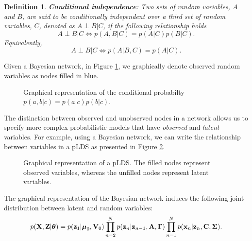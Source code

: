 \documentclass[12pt, oneside]{book}
\numberwithin{equation}{section}
\newcommand{\x}{{\bf x}}
\newcommand{\z}{{\bf z}}
\newtheorem{definition}{Definition}[section]
\begin{document}
{%
\begin{definition}
	\textbf{Conditional independence}: Two sets of random variables, $A$ and $B$, are said to be conditionally independent over a third set of random variables, $C$, denoted as $A \perp B \vert C$, if the following relationship holds
	\begin{equation}
		A \perp B \vert C \iff p(A, B \vert C) = p(A \vert C) p(B \vert C).
	\end{equation}
	Equivalently,
	\begin{equation}
		A \perp B \vert C \iff p(A \vert B, C) = p(A \vert C).
	\end{equation}
\end{definition}

Given a Bayesian network, in Figure \ref{fig:bayes-net-3}, we graphically denote observed random variables as nodes filled in blue. 

\begin{figure}[h!]
	\centering
	
	\caption{Graphical representation of the conditional probabilty $p(a, b\vert c) = p(a \vert c) p(b \vert c)$.}
	\label{fig:bayes-net-3}
\end{figure}


The distinction between observed and unobserved nodes in a network allows us to specify more complex probabilistic models that have \textit{observed} and \textit{latent} variables. For example, using a Bayesian network, we can write the relationship between variables in a pLDS as presented in Figure \ref{fig:lds-gm}.

\begin{figure}[h!]
	\centering
	
	\caption{Graphical representation of a pLDS. The filled nodes represent observed variables, whereas the unfilled nodes represent latent variables.}
	\label{fig:lds-gm}
\end{figure}

The graphical representation of the Bayesian network induces the following joint distribution between latent and random variables:
\begin{equation}
	p({\bf X}, {\bf Z} \vert\boldsymbol\theta) = p(\z_1 \vert \boldsymbol\mu_0, {\bf V}_0)\prod_{n=2}^N p(\z_n\vert \z_{n-1}, {\bf A}, \boldsymbol\Gamma)\prod_{n=1}^N p(\x_n\vert \z_n, {\bf C}, \boldsymbol\Sigma).
\end{equation}

}
\end{document}

